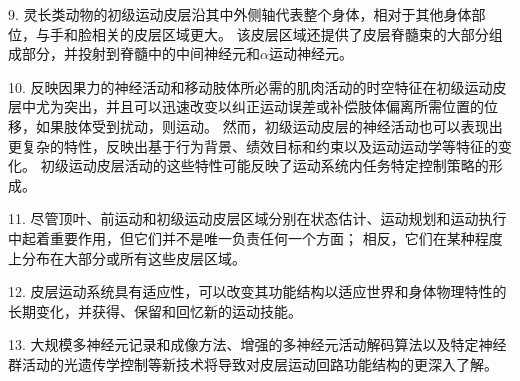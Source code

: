 9. 灵长类动物的初级运动皮层沿其中外侧轴代表整个身体，相对于其他身体部位，与手和脸相关的皮层区域更大。
该皮层区域还提供了皮层脊髓束的大部分组成部分，并投射到脊髓中的中间神经元和$ \alpha $运动神经元。


10. 反映因果力的神经活动和移动肢体所必需的肌肉活动的时空特征在初级运动皮层中尤为突出，并且可以迅速改变以纠正运动误差或补偿肢体偏离所需位置的位移，如果肢体受到扰动，则运动。
然而，初级运动皮层的神经活动也可以表现出更复杂的特性，反映出基于行为背景、绩效目标和约束以及运动运动学等特征的变化。
初级运动皮层活动的这些特性可能反映了运动系统内任务特定控制策略的形成。


11. 尽管顶叶、前运动和初级运动皮层区域分别在状态估计、运动规划和运动执行中起着重要作用，但它们并不是唯一负责任何一个方面；
相反，它们在某种程度上分布在大部分或所有这些皮层区域。


12. 皮层运动系统具有适应性，可以改变其功能结构以适应世界和身体物理特性的长期变化，并获得、保留和回忆新的运动技能。


13. 大规模多神经元记录和成像方法、增强的多神经元活动解码算法以及特定神经群活动的光遗传学控制等新技术将导致对皮层运动回路功能结构的更深入了解。

